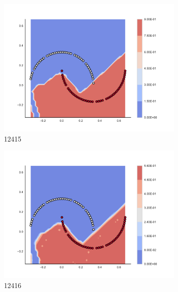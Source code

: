 \begin{figure}[h]
\begin{subfigure}[b]{0.09\textwidth}
    \includegraphics[clip, trim=2.35cm 1.75cm 4.5cm 0cm,width=\textwidth]{img/convergence/12415.pdf}
    \caption{12415}
    \label{fig:convergence_12415}
\end{subfigure}
%
\begin{subfigure}[b]{0.09\textwidth}
    \includegraphics[clip, trim=2.35cm 1.75cm 4.5cm 0cm,width=\textwidth]{img/convergence/12416.pdf}
    \caption{12416}
    \label{fig:convergence_12416}
\end{subfigure}
%
\begin{subfigure}[b]{0.09\textwidth}

\end{subfigure}
\end{figure}
